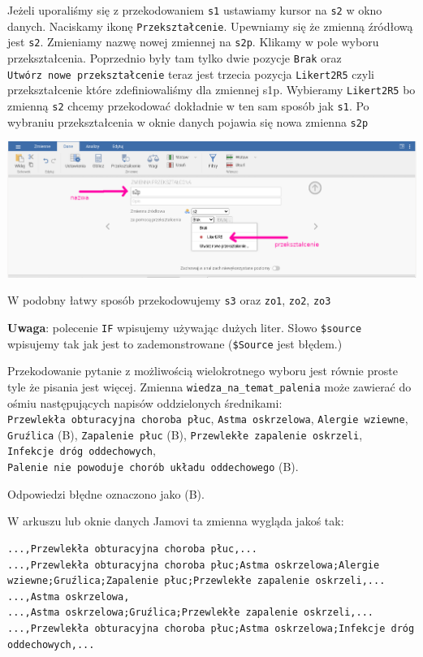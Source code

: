 \documentclass[
  openany]{book}
\begin{document}
Jeżeli uporaliśmy się z przekodowaniem \texttt{s1}
ustawiamy kursor na \texttt{s2} w okno danych. Naciskamy ikonę \texttt{Przekształcenie}.
Upewniamy się że zmienną źródłową jest \texttt{s2}.
Zmieniamy nazwę nowej zmiennej na \texttt{s2p}. Klikamy
w pole wyboru przekształcenia. Poprzednio były tam tylko dwie pozycje
\texttt{Brak} oraz \texttt{Utwórz\ nowe\ przekształcenie} teraz jest trzecia pozycja
\texttt{Likert2R5} czyli przekształcenie które zdefiniowaliśmy dla zmiennej s1p.
Wybieramy \texttt{Likert2R5} bo zmienną \texttt{s2} chcemy przekodować dokładnie
w ten sam sposób jak \texttt{s1}. Po wybraniu przekształcenia w oknie danych
pojawia się nowa zmienna \texttt{s2p}

\includegraphics{./przeksztalcenie_3.png}

W podobny łatwy sposób przekodowujemy \texttt{s3} oraz \texttt{zo1}, \texttt{zo2}, \texttt{zo3}

\textbf{Uwaga}: polecenie \texttt{IF} wpisujemy używając dużych liter. Słowo
\texttt{\$source} wpisujemy tak jak jest to zademonstrowane (\texttt{\$Source} jest błędem.)

Przekodowanie pytanie z możliwością wielokrotnego wyboru jest równie
proste tyle że pisania jest więcej. Zmienna \texttt{wiedza\_na\_temat\_palenia} może zawierać
do ośmiu następujących napisów oddzielonych średnikami:
\texttt{Przewlekła\ obturacyjna\ choroba\ płuc},
\texttt{Astma\ oskrzelowa},
\texttt{Alergie\ wziewne},
\texttt{Gruźlica} (B),
\texttt{Zapalenie\ płuc} (B),
\texttt{Przewlekłe\ zapalenie\ oskrzeli},
\texttt{Infekcje\ dróg\ oddechowych},
\texttt{Palenie\ nie\ powoduje\ chorób\ układu\ oddechowego} (B).

Odpowiedzi błędne oznaczono jako (B).

W arkuszu lub oknie danych Jamovi ta zmienna wygląda jakoś tak:

\begin{verbatim}
...,Przewlekła obturacyjna choroba płuc,...
...,Przewlekła obturacyjna choroba płuc;Astma oskrzelowa;Alergie wziewne;Gruźlica;Zapalenie płuc;Przewlekłe zapalenie oskrzeli,...
...,Astma oskrzelowa,
...,Astma oskrzelowa;Gruźlica;Przewlekłe zapalenie oskrzeli,...
...,Przewlekła obturacyjna choroba płuc;Astma oskrzelowa;Infekcje dróg oddechowych,...
\end{verbatim}
\end{document}
